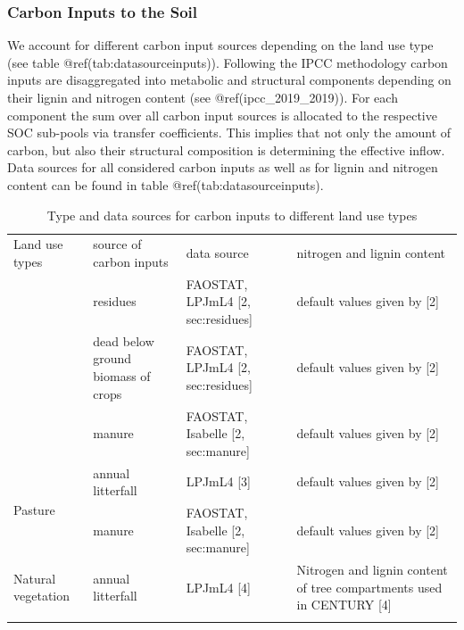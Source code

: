 \documentclass[gc, manuscript]{copernicus}
\begin{document}
\hypertarget{sec:carboninputs}{%
\subsubsection{Carbon Inputs to the Soil}\label{sec:carboninputs}}

We account for different carbon input sources depending on the land use
type (see table @ref(tab:datasourceinputs)). Following the IPCC
methodology carbon inputs are disaggregated into metabolic and
structural components depending on their lignin and nitrogen content
(see @ref(ipcc\_2019\_2019)). For each component the sum over all carbon
input sources is allocated to the respective SOC sub-pools via transfer
coefficients. This implies that not only the amount of carbon, but also
their structural composition is determining the effective inflow. Data
sources for all considered carbon inputs as well as for lignin and
nitrogen content can be found in table @ref(tab:datasourceinputs).

 \begin{table}[h]
 \caption{Type and data sources for carbon inputs to different land use types}
 \begin{tabular}{l l l l}
 \tophline
  Land use types   & source of carbon inputs & data source & nitrogen and lignin content \\
 \middlehline
 \multirow{3}{*}{Cropland} & residues & FAOSTAT, LPJmL4 [2, sec:residues] & default values given by [2]  \\
                            & dead below ground biomass of crops & FAOSTAT, LPJmL4 [2, sec:residues] & default values given by [2] \\
                            & manure & FAOSTAT, Isabelle [2, sec:manure] & default values given by [2] \\
                            \hline
 \multirow{2}{*}{Pasture}  & annual litterfall & LPJmL4 [3] & default values given by [2] \\ 
                            & manure  & FAOSTAT, Isabelle [2, sec:manure] & default values given by [2] \\
                            \hline
  Natural vegetation        & annual litterfall & LPJmL4 [4]& \begin{minipage}[t]{0.28\columnwidth}\raggedright\strut Nitrogen and lignin content of tree compartments used in CENTURY [4] \strut \end{minipage}\tabularnewline
 \bottomhline
 \end{tabular}
 \label{tab:datasourceinputs}
 \belowtable{}
 \end{table}
\end{document}
